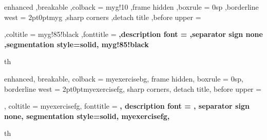 %
%
%
%
%


{%
	enhanced
	,breakable
	,colback = myg!10
	,frame hidden
	,boxrule = 0sp
	,borderline west = {2pt}{0pt}{myg}
	,sharp corners
	,detach title
	,before upper = \tcbtitle\par\smallskip
	,coltitle = myg!85!black
	,fonttitle = \bfseries\sffamily
	,description font = \mdseries
	,separator sign none
	,segmentation style={solid, myg!85!black}
}
{th}




{%
	enhanced,
	breakable,
	colback = myexercisebg,
	frame hidden,
	boxrule = 0sp,
	borderline west = {2pt}{0pt}{myexercisefg},
	sharp corners,
	detach title,
	before upper = \tcbtitle\par\smallskip,
	coltitle = myexercisefg,
	fonttitle = \bfseries\sffamily,
	description font = \mdseries,
	separator sign none,
	segmentation style={solid, myexercisefg},
}
{th}

